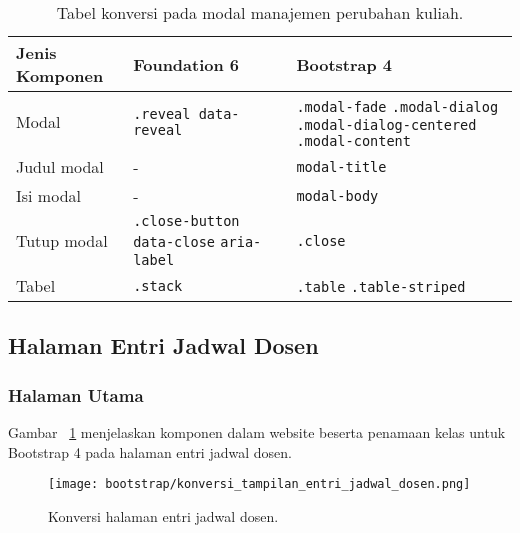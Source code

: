 \begin{table}[H]
	\caption{Tabel konversi pada modal manajemen perubahan kuliah.}
	\begin{tabular}{| p{} | p{} | p{} |} 
		\hline
		\textbf{Jenis Komponen} & \textbf{Foundation 6} & \textbf{Bootstrap 4}  \\ [0.5ex] 
		\hline	
		Modal & \texttt{.reveal data-reveal} & \texttt{.modal-fade} \newline \texttt{.modal-dialog} \newline \texttt{.modal-dialog-centered} \newline \texttt{.modal-content} \\
		\hline
		Judul modal & - & \texttt{modal-title}\\
		\hline
		Isi modal & - & \texttt{modal-body}\\
		\hline
		Tutup modal & \texttt{.close-button} \newline \texttt{data-close} \newline \texttt{aria-label} & \texttt{.close}\\
		\hline	
		Tabel & \texttt{.stack} & \texttt{.table} \newline \texttt{.table-striped} \\[1ex]
		\hline
	\end{tabular}
	\label{table:konversiModalManajemenPerubahanKuliah}
\end{table}

\subsection{Halaman Entri Jadwal Dosen}
\subsubsection{Halaman Utama}
\noindent Gambar ~\ref{fig:konversiEntriJadwalDosen} menjelaskan komponen dalam website beserta penamaan kelas untuk Bootstrap 4 pada halaman entri jadwal dosen.\\
\begin{figure} [H]
	\centering  
	\texttt{[image: bootstrap/konversi\_tampilan\_entri\_jadwal\_dosen.png]}
	\caption{Konversi halaman entri jadwal dosen.}
	\label{fig:konversiEntriJadwalDosen}
\end{figure}

